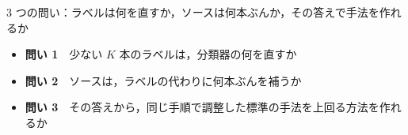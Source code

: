 \begin{frame}{3 つの問い：ラベルは何を直すか，ソースは何本ぶんか，その答えで手法を作れるか}
  \vspace{0.4em}
  \begin{itemize}\small\setlength{\itemsep}{10pt}
    \item \textbf{問い 1}　少ない $K$ 本のラベルは，分類器の何を直すか\par
    \item \textbf{問い 2}　ソースは，ラベルの代わりに何本ぶんを補うか\par
    \item \textbf{問い 3}　その答えから，同じ手順で調整した標準の手法を上回る方法を作れるか\par
  \end{itemize}
  \vspace{0.3em}
\end{frame}

